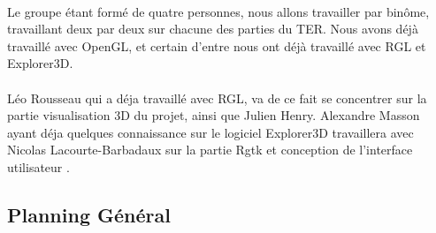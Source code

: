 \paragraph{} 
Le groupe étant formé de quatre personnes, nous allons travailler par binôme, travaillant deux par deux sur chacune des parties du TER. Nous avons déjà travaillé avec OpenGL, et certain d'entre nous ont déjà travaillé avec RGL et Explorer3D. 

\paragraph{} Léo Rousseau qui a déja travaillé avec RGL, va de ce fait se concentrer sur la partie visualisation 3D du projet, ainsi que Julien Henry. Alexandre Masson ayant déja quelques connaissance sur le logiciel Explorer3D travaillera avec Nicolas Lacourte-Barbadaux sur la partie Rgtk et conception de l'interface utilisateur .

\newpage
\subsection{Planning Général}
\newpage